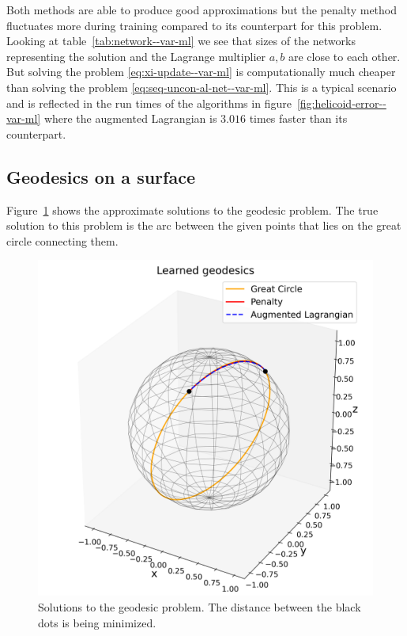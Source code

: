 Both methods are able to produce good approximations but the penalty method fluctuates more during training compared to its counterpart for this problem. Looking at table~\ref{tab:network--var-ml} we see that sizes of the networks representing the solution and the Lagrange multiplier $a, b$ are close to each other. But solving the problem \eqref{eq:xi-update--var-ml} is computationally much cheaper than solving the problem \eqref{eq:seq-uncon-al-net--var-ml}. This is a typical scenario and is reflected in the run times of the algorithms in figure~\ref{fig:helicoid-error--var-ml} where the augmented Lagrangian is $3.016$ times faster than its counterpart.

\subsection{Geodesics on a surface}
Figure~\ref{fig:geo--var-ml} shows the approximate solutions to the geodesic problem. The true solution to this problem is the arc between the given points that lies on the great circle connecting them.
\begin{figure}[!ht]
    \centering
\includegraphics[scale=0.4]{var-ml/plots/var-plots-sphere-geodesic.png}
    \caption{Solutions to the geodesic problem. The distance between the black dots is being minimized.}
    \label{fig:geo--var-ml}
\end{figure}
